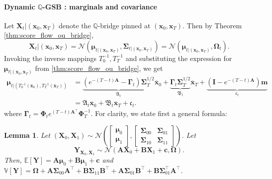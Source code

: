 \documentclass{article}
\newcommand{\E}{\mathbb{E}}
\newcommand{\V}{\mathbb{V}}
\newcommand{\Nc}{\mathcal{N}}
\newcommand{\bmathfrak}[1]{\bm{\mathfrak{#1}}}
\theoremstyle{newstyle}
\newtheorem{lem}{Lemma}
\begin{document}
\paragraph{Dynamic $\mathbb{Q}$-GSB : marginals and covariance}
Let $\bm{X}_t | (\bm{x}_0, \bm{x}_T)$ denote the $\mathbb{Q}$-bridge pinned at $(\bm{x}_0, \bm{x}_T)$. Then by Theorem \ref{thm:score_flow_ou_bridge},  
\[
  \bm{X}_t | (\bm{x}_0, \bm{x}_T) = \Nc(\bm{\mu}_{t | (\bm{x}_0, \bm{x}_T)}, \bm{\Sigma}_{t | (\bm{x}_0, \bm{x}_T)}) = \Nc(\bm{\mu}_{t | (\bm{x}_0, \bm{x}_T)}, \bm{\Omega}_t). 
\]
Invoking the inverse mappings $T_0^{-1}, T_T^{-1}$ and substituting the expression for $\bm{\mu}_{t | (\bm{x}_0, \bm{x}_T)}$ from \ref{thm:score_flow_ou_bridge}, we get 
\begin{align}
  \bm{\mu}_{t | (T_0^{-1}(\overline{\bm{x}}_0), T_T^{-1}(\overline{\bm{x}}_T))} &= \underbrace{\left( e^{-(T-t)\bm{A}} - \bm{\Gamma}_t \right) \bm{\Sigma}_T^{1/2}}_{\bmathfrak{A}_t} \bm{\overline{x}}_0 + \underbrace{\bm{\Gamma}_t \bm{\Sigma}_T^{1/2}}_{\bmathfrak{B}_t} \bm{\overline{x}}_T + \underbrace{\left(\bm{I} - e^{-(T-t)\bm{A}}\right) \bm{m}}_{\bmathfrak{c}_t} \\
                                                                                &= \bmathfrak{A}_t \overline{\bm{x}}_0 + \bmathfrak{B}_t \overline{\bm{x}}_T + \bmathfrak{c}_t. \label{eq:mvOU_bridge_expression_ABC}
\end{align}
where $\bm{\Gamma}_t = \bm{\Phi}_t e^{(T-t)\bm{A}^\top} \bm{\Phi}_T^{-1}$. For clarity, we state first a general formula: 
\begin{lem}
  Let $(\bm{X}_0, \bm{X}_1) \sim \Nc\left(\begin{bmatrix} \bm{\mu}_0 \\ \bm{\mu}_1 \end{bmatrix}, \begin{bmatrix} \bm{\Sigma}_{00} & \bm{\Sigma}_{01} \\ \bm{\Sigma}_{10} & \bm{\Sigma}_{11} \end{bmatrix} \right)$. Let
\[
  \bm{Y}_{\bm{X}_0, \bm{X}_1} \sim \Nc(\bm{A} \bm{X}_0 + \bm{B} \bm{X}_1 + \bm{c}, \bm{\Omega}). 
\]
Then, $\E[\bm{Y}] = \bm{A}\bm{\mu}_0 + \bm{B}\bm{\mu}_1 + \bm{c}$ and $\V[\bm{Y}] = \bm{\Omega} + \bm{A}\bm{\Sigma}_{00}\bm{A}^\top + \bm{B}\bm{\Sigma}_{11} \bm{B}^\top + \bm{A} \bm{\Sigma}_{01} \bm{B}^\top + \bm{B} \bm{\Sigma}_{01}^\top \bm{A}^\top$.
\end{lem}
\end{document}
